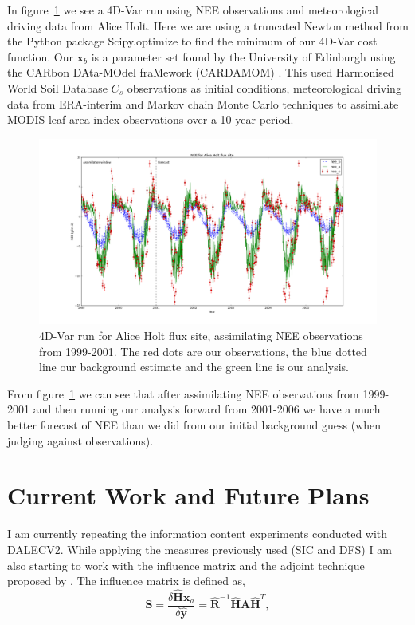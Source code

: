 \documentclass[11pt]{article}
\begin{document}
In figure~\ref{fig:4dvar} we see a 4D-Var run using NEE observations and meteorological driving data from Alice Holt. Here we are using a truncated Newton method \citep{Nocedal1999} from the Python package Scipy.optimize to find the minimum of our 4D-Var cost function. Our $\textbf{x}_b$ is a parameter set found by the University of Edinburgh using the CARbon DAta-MOdel fraMework (CARDAMOM) \citep{Exbrayat2015}. This used Harmonised World Soil Database $C_{s}$ observations as initial conditions, meteorological driving data from ERA-interim and Markov chain Monte Carlo techniques to assimilate MODIS leaf area index observations over a 10 year period. 

\begin{figure}[!hb]
    \centering
    \includegraphics[width=.9\textwidth]{ah_assim_edinpvals.png}
    \caption{4D-Var run for Alice Holt flux site, assimilating NEE observations from 1999-2001. The red dots are our observations, the blue dotted line our background estimate and the green line is our analysis.}
    \label{fig:4dvar}
\end{figure}

From figure~\ref{fig:4dvar} we can see that after assimilating NEE observations from 1999-2001 and then running our analysis forward from 2001-2006 we have a much better forecast of NEE than we did from our initial background guess (when judging against observations). 

\section{Current Work and Future Plans}

I am currently repeating the information content experiments conducted with DALECV2. While applying the measures previously used (SIC and DFS) I am also starting to work with the influence matrix \citep{Cardinali2004} and the adjoint technique proposed by \cite{Langland2004}. The influence matrix is defined as,
\begin{equation}
\textbf{S} = \frac{\delta \hat{\mathbf{H}}\textbf{x}_a}{\delta \hat{\textbf{y}}} = \hat{\textbf{R}}^{-1}\hat{\mathbf{H}}\textbf{A}\hat{\mathbf{H}}^{T},
\end{equation}
\end{document}
